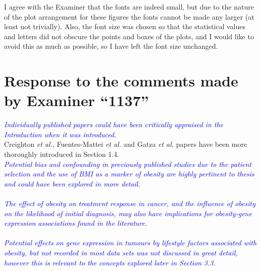 \documentclass[a4paper, 12pt]{article}
\begin{document}
\noindent
I agree with the Examiner that the fonts are indeed small, but due to the nature of the plot arrangement for these figures the fonts cannot be made any larger (at least not trivially).
Also, the font size was chosen so that the statistical values and letters did not obscure the points and boxes of the plots, and I would like to avoid this as much as possible, so I have left the font size unchanged.
\\

\newpage

\section*{Response to the comments made by Examiner ``1137''}
\label{sec:response_to_comments_from_examiner_1137}

\noindent
\textcolor{blue}{
	\textit{Individually published papers could have been critically appraised in the Introduction when it was introduced.
	}
}\\

\noindent
Creighton \textit{et al.}, Fuentes-Mattei \textit{et al.} and Gatza \textit{et al.} papers have been more thoroughly introduced in Section 1.4.
\\

\noindent
\textcolor{blue}{
	\textit{Potential bias and confounding in previously published studies due to the patient selection and the use of BMI as a marker of obesity are highly pertinent to thesis and could have been explored in more detail.
	}
}\\

\noindent
\\

\noindent
\textcolor{blue}{
	\textit{The effect of obesity on treatment response in cancer, and the influence of obesity on the likelihood of initial diagnosis, may also have implications for obesity-gene expression associations found in the literature.
	}
}\\

\noindent
\\

\noindent
\textcolor{blue}{
	\textit{Potential effects on gene expression in tumours by lifestyle factors associated with obesity, but not recorded in most data sets was not discussed in great detail, however this is relevant to the concepts explored later in Section 3.3.
	}
}\\
\end{document}
